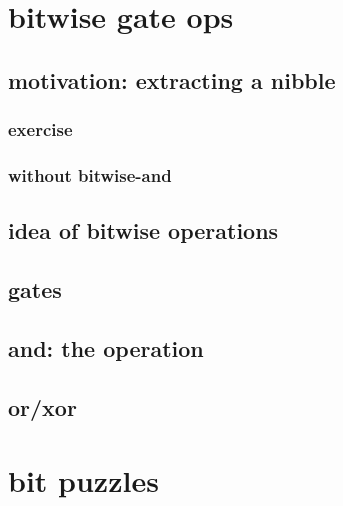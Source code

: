 

\section{bitwise gate ops}

\subsection{motivation: extracting a nibble}



\subsubsection{exercise}



\subsubsection{without bitwise-and}


\subsection{idea of bitwise operations}



\subsection{gates}



\subsection{and: the operation}




\subsection{or/xor}





\section{bit puzzles}

